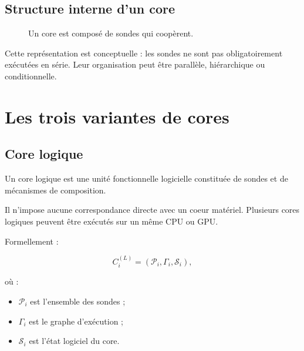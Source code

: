 \documentclass[11pt,a4paper]{article}
\begin{document}
\subsection{Structure interne d'un core}

\begin{figure}[H]
\centering
{}
\caption{Un core est composé de sondes qui coopèrent.}
\end{figure}

Cette représentation est conceptuelle : les sondes ne sont pas
obligatoirement exécutées en série. Leur organisation peut être
parallèle, hiérarchique ou conditionnelle.

\section{Les trois variantes de cores}

\subsection{Core logique}

Un core logique est une unité fonctionnelle logicielle constituée
de sondes et de mécanismes de composition.

Il n'impose aucune correspondance directe avec un coeur matériel.
Plusieurs cores logiques peuvent être exécutés sur un même CPU ou GPU.

Formellement :

\[
C_i^{(L)}
=
(\mathcal{P}_i,\Gamma_i,\mathcal{S}_i),
\]

où :
\begin{itemize}
  \item $\mathcal{P}_i$ est l'ensemble des sondes ;
  \item $\Gamma_i$ est le graphe d'exécution ;
  \item $\mathcal{S}_i$ est l'état logiciel du core.
\end{itemize}
\end{document}
